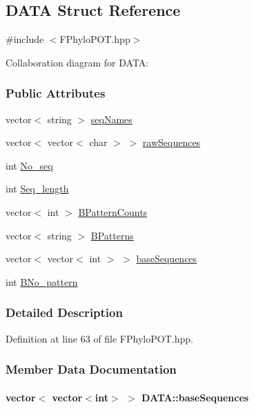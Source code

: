 \hypertarget{structDATA}{\subsection{\-D\-A\-T\-A \-Struct \-Reference}
\label{structDATA}
}


{\ttfamily \#include $<$\-F\-Phylo\-P\-O\-T.\-hpp$>$}



\-Collaboration diagram for \-D\-A\-T\-A\-:
\subsubsection*{\-Public \-Attributes}
\begin{DoxyCompactItemize}
\item 
vector$<$ string $>$ \hyperlink{structDATA_af4cdaf38ce8f08aecdff70e4301bca38}{seq\-Names}
\item 
vector$<$ vector$<$ char $>$ $>$ \hyperlink{structDATA_aa02f132fe5b0ecd2f64374da002efbec}{raw\-Sequences}
\item 
int \hyperlink{structDATA_a988fb40b7296abe1c35d07aba414922d}{\-No\-\_\-seq}
\item 
int \hyperlink{structDATA_ad43ceda299bda19eae5a7b5f1f17ce06}{\-Seq\-\_\-length}
\item 
vector$<$ int $>$ \hyperlink{structDATA_a781e3ff29ee1a5d9bc8816a076b26819}{\-B\-Pattern\-Counts}
\item 
vector$<$ string $>$ \hyperlink{structDATA_a1095aaedbb062c91c75a9dca7accc248}{\-B\-Patterns}
\item 
vector$<$ vector$<$ int $>$ $>$ \hyperlink{structDATA_ab267d3dd20bbe5abf0cf0d33c4a8ffdf}{base\-Sequences}
\item 
int \hyperlink{structDATA_a78e93d9dabc45d060155d164db458b3a}{\-B\-No\-\_\-pattern}
\end{DoxyCompactItemize}


\subsubsection{\-Detailed \-Description}


\-Definition at line 63 of file \-F\-Phylo\-P\-O\-T.\-hpp.



\subsubsection{\-Member \-Data \-Documentation}
\hypertarget{structDATA_ab267d3dd20bbe5abf0cf0d33c4a8ffdf}{
\paragraph[{base\-Sequences}]{\setlength{\rightskip}{0pt plus 5cm}vector$<$ vector$<$int$>$ $>$ {\bf \-D\-A\-T\-A\-::base\-Sequences}}}\label{structDATA_ab267d3dd20bbe5abf0cf0d33c4a8ffdf}


